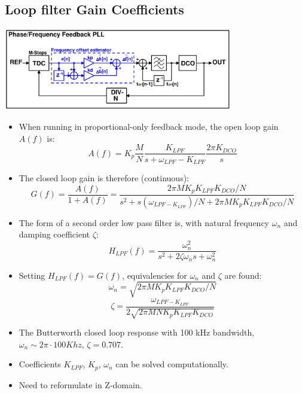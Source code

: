 \documentclass[10pt,a4paper]{article}
\begin{document}
		\flushleft
		\subsection{Loop filter Gain Coefficients}
		\vspace{-0.5em}
		\center\includegraphics[width=0.75\textwidth, angle=0]{figs/more_advanced.pdf}
		\begin{itemize}
			\footnotesize
			\item When running in proportional-only feedback mode, the open loop gain $A(f)$ is:
			\tiny
			\begin{equation}
				A(f) = K_p \frac{M}{N}\frac{K_{LPF}}{s + \omega_{LPF} - K_{LPF}}\frac{2\pi K_{DCO}}{s}
			\end{equation}
			\footnotesize
			\item The closed loop gain is therefore (continuous):
			\tiny
			\begin{equation}
				G(f) =  \frac{A(f)}{1+A(f)}= \frac{2\pi M K_pK_{LPF}K_{DCO}/N}{s^2+s(\omega_{LPF - K_{LPF}})/N + 2\pi M K_pK_{LPF}K_{DCO}/N}
			\end{equation}	
		\end{itemize} 
		\begin{itemize}
			\scriptsize
			\item The form of a second order low pass filter is, with natural frequency $\omega_n$ and damping coefficient $\zeta$:
			\tiny
			\begin{equation}
				H_{LPF}(f) = \frac{\omega_n^2}{s^2 + 2\zeta\omega_ns + \omega_n^2}
			\end{equation}
			\scriptsize
			\item Setting $H_{LPF}(f) = G(f)$, equivalencies for $\omega_n$ and $\zeta$ are found:
			\tiny
			\begin{equation}
				\omega_n = \sqrt{2\pi M K_pK_{LPF}K_{DCO}/N}
			\end{equation}			
			\begin{equation}
				\zeta = \frac{\omega_{LPF - K_{LPF}}}{2\sqrt{2\pi MN K_pK_{LPF}K_{DCO}}}
			\end{equation}	
			\scriptsize
			\item The Butterworth closed loop response with 100 kHz bandwidth, $\omega_n \sim 2\pi\cdot 100 Khz$, $\zeta=0.707$.
			\item Coefficients $K_{LPF}$, $K_p$, $\omega_n$ can be solved computationally.
			\item Need to reformulate in Z-domain.
		\end{itemize} 	
\end{document}
